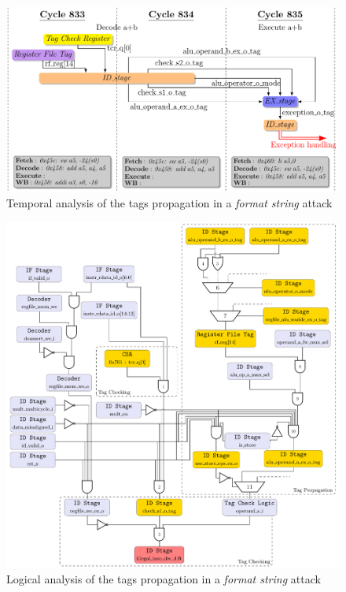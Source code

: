 \begin{frame}[noframenumbering]{}
    \begin{figure}
        \centering
        \includegraphics[height=.85\textheight]{src/2_vuln_assessment/img/comp_compu/attaquePropag_v3_short.pdf}
        \caption{Temporal analysis of the tags propagation in a \textit{format string} attack}
        \label{fig:analyseTempoCompCompute}
    \end{figure}
\end{frame}

\begin{frame}[noframenumbering]{}
    \begin{figure}
        \centering
        \includegraphics[height=.85\textheight]{src/2_vuln_assessment/img/comp_compu/arborescence_propagation.pdf}
        \caption{Logical analysis of the tags propagation in a \textit{format string} attack}
        \label{fig:analyseLogiqueCompCompute}
    \end{figure}
\end{frame}
